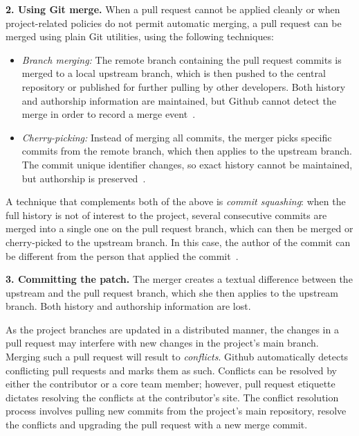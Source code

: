 \documentclass{sig-alternate}
\begin{document}
\textbf{2. Using Git merge.} When a pull request cannot be applied cleanly or
    when project-related policies do not permit automatic merging, a pull
    request can be merged using plain Git utilities, using the following
    techniques: 

    \begin{itemize}

      \item \emph{Branch merging:} The remote branch containing the pull request
        commits is merged to a local upstream branch, which is then pushed to
        the central repository or published for further pulling by other
        developers. Both history and authorship information are maintained, but
        Github cannot detect the merge in order to record a merge
        event~\cite[Chapter 3.2]{Chaco09}. 

      \item \emph{Cherry-picking:} Instead of merging all commits, the merger
        picks specific commits from the remote branch, which then applies to the
        upstream branch. The commit unique identifier changes, so exact history
        cannot be maintained, but authorship is 
        preserved~\cite[Chapter 5.3]{Chaco09}.
    
    \end{itemize}

    A technique that complements both of the above is \emph{commit
    squashing}: when the full history is not of interest to the project,
    several consecutive commits are merged into a single one on the pull request
    branch, which can then be merged or cherry-picked to the upstream branch. In
    this case, the author of the commit can be different from the person that
    applied the commit~\cite[Chapter 6.4]{Chaco09}.

\textbf{3. Committing the patch.} 
  The merger creates a textual difference between the upstream and the pull
  request branch, which she then applies to the upstream branch. Both history and
  authorship information are lost.

As the project branches are updated in a distributed manner, the changes in a
pull request may interfere with new changes in the project's main branch. Merging
such a pull request will result to \emph{conflicts}. Github automatically
detects conflicting pull requests and marks them as such. Conflicts can be
resolved by either the contributor or a core team member; however, pull request
etiquette dictates resolving the conflicts at the contributor's site. The
conflict resolution process involves pulling new commits from the project's main
repository, resolve the conflicts and upgrading the pull request with a new
merge commit.
\end{document}
